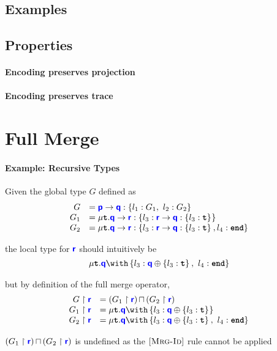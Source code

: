 \documentclass{article}
\begin{document}
\subsection{Examples}

\subsection{Properties}

\paragraph{Encoding preserves projection}

\paragraph{Encoding preserves trace}

\clearpage

\section{Full Merge}

\paragraph{Example: Recursive Types}
Given the global type $G$ defined as
\[
\begin{array}{rl}
G &= {\color{blue}\bm{\mathsf{p}}} \to {\color{blue}\bm{\mathsf{q}}} : \left\{ {l_1: G_1,~l_2: G_2} \right\}_{} \\
G_1 &= \mu\textbf{\texttt{t}}.{{\color{blue}\bm{\mathsf{q}}} \to {\color{blue}\bm{\mathsf{r}}} : \left\{ {l_3: {\color{blue}\bm{\mathsf{r}}} \to {\color{blue}\bm{\mathsf{q}}} : \left\{ {l_3: \textbf{\texttt{t}}} \right\}_{}} \right\}_{}} \\
G_2 &= \mu\textbf{\texttt{t}}.{{\color{blue}\bm{\mathsf{q}}} \to {\color{blue}\bm{\mathsf{r}}} : \left\{ {l_3: {\color{blue}\bm{\mathsf{r}}} \to {\color{blue}\bm{\mathsf{q}}} : \left\{ {l_3: \textbf{\texttt{t}}} \right\}_{}, l_4: \textbf{\texttt{end}}} \right\}_{}}
\end{array}
\]

the local type for ${\color{blue}\bm{\mathsf{r}}}$ should intuitively be
\[
\tyrec{
\tybra{q}{l_3: \tysel{q}{l_3: \tyrecvar}{},~l_4: \tyend}{}
}
\]

but by definition of the full merge operator,
\[
\begin{array}{rl}
\proj{G}{r} &= \tymerge{\left(\proj{G_1}{r}\right)}{\left(\proj{G_2}{r}\right)} \\
\proj{G_1}{r} &= \tyrec{\tybra{q}{l_3: \tysel{q}{l_3: \tyrecvar}{}}{}} \\
\proj{G_2}{r} &= \tyrec{\tybra{q}{l_3: \tysel{q}{l_3: \tyrecvar}{},~l_4: \tyend}{}}
\end{array}
\]

${\left({G_1} \upharpoonright {\color{blue}\bm{\mathsf{r}}}\right)}\,{\sqcap}\,{\left({G_2} \upharpoonright {\color{blue}\bm{\mathsf{r}}}\right)}$ is undefined as the $[\textsc{Mrg-Id}]$ rule
cannot be applied
\end{document}
